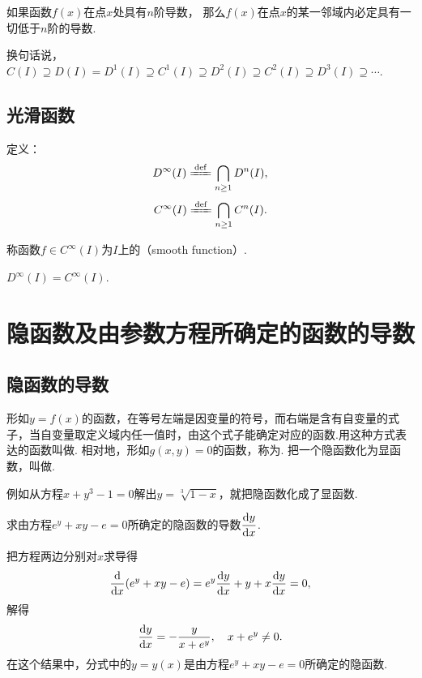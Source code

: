 \begin{theorem}
如果函数\(f(x)\)在点\(x\)处具有\(n\)阶导数，
那么\(f(x)\)在点\(x\)的某一邻域内必定具有一切低于\(n\)阶的导数.
\end{theorem}
换句话说，\(
C(I) \supseteq
D(I) = D^1(I) \supseteq
C^1(I) \supseteq
D^2(I) \supseteq
C^2(I) \supseteq
D^3(I) \supseteq
\dotsb
\).

\subsection{光滑函数}
\begin{definition}\label{definition:函数族.光滑函数族}
定义：\[
	D^\infty (I) \defeq \bigcap\limits_{n\geq1} D^n(I),
\]\[
	C^\infty (I) \defeq \bigcap\limits_{n\geq1} C^n(I).
\]

称函数\(f \in C^\infty (I)\)为\(I\)上的（smooth function）.
\end{definition}

\begin{property}\label{theorem:函数族.光滑函数族的性质1}
\(D^\infty (I) = C^\infty (I)\).
\end{property}

\section{隐函数及由参数方程所确定的函数的导数}\label{section:导数与微分.隐函数及由参数方程所确定的函数的导数}
\subsection{隐函数的导数}
\begin{definition}
形如\(y=f(x)\)的函数，在等号左端是因变量的符号，而右端是含有自变量的式子，当自变量取定义域内任一值时，由这个式子能确定对应的函数.用这种方式表达的函数叫做.
相对地，形如\(g(x,y)=0\)的函数，称为.
把一个隐函数化为显函数，叫做.
\end{definition}

\begin{example}
例如从方程\(x+y^3-1=0\)解出\(y=\sqrt[3]{1-x}\)，就把隐函数化成了显函数.
\end{example}

\begin{example}
求由方程\(e^y + xy - e = 0\)所确定的隐函数的导数\(\displaystyle\dv{y}{x}\).
\begin{solution}
把方程两边分别对\(x\)求导得\[
\dv{x}(e^y+xy-e) = e^y \dv{y}{x} + y + x \dv{y}{x} = 0,
\]解得\[
\dv{y}{x} = -\frac{y}{x+e^y},
\quad x+e^y \neq 0.
\]在这个结果中，分式中的\(y=y(x)\)是由方程\(e^y + xy - e = 0\)所确定的隐函数.
\end{solution}
\end{example}

